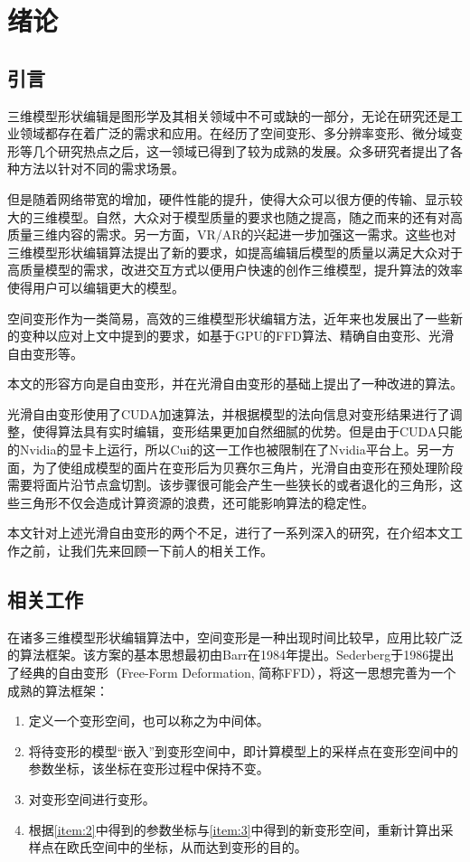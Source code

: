 
\chapter{绪论}
\section{引言}
三维模型形状编辑是图形学及其相关领域中不可或缺的一部分，无论在研究还是工业领域都存在着广泛的需求和应用。在经历了空间变形、多分辨率变形、微分域变形等几个研究热点之后，这一领域已得到了较为成熟的发展。众多研究者提出了各种方法以针对不同的需求场景。

但是随着网络带宽的增加，硬件性能的提升，使得大众可以很方便的传输、显示较大的三维模型。自然，大众对于模型质量的要求也随之提高，随之而来的还有对高质量三维内容的需求。另一方面，VR/AR的兴起进一步加强这一需求。这些也对三维模型形状编辑算法提出了新的要求，如提高编辑后模型的质量以满足大众对于高质量模型的需求，改进交互方式以便用户快速的创作三维模型，提升算法的效率使得用户可以编辑更大的模型。

空间变形作为一类简易，高效的三维模型形状编辑方法，近年来也发展出了一些新的变种以应对上文中提到的要求，如基于GPU的FFD算法\cite{chua2000, modat2010}、精确自由变形\cite{Feng98, Feng00}、光滑自由变形\cite{Cui15}等。

本文的形容方向是自由变形，并在光滑自由变形\cite{Cui15}的基础上提出了一种改进的算法。

光滑自由变形使用了CUDA加速算法，并根据模型的法向信息对变形结果进行了调整，使得算法具有实时编辑，变形结果更加自然细腻的优势。但是由于CUDA只能的Nvidia的显卡上运行，所以Cui的这一工作也被限制在了Nvidia平台上。另一方面，为了使组成模型的面片在变形后为贝赛尔三角片，光滑自由变形在预处理阶段需要将面片沿节点盒切割。该步骤很可能会产生一些狭长的或者退化的三角形，这些三角形不仅会造成计算资源的浪费，还可能影响算法的稳定性。

本文针对上述光滑自由变形的两个不足，进行了一系列深入的研究，在介绍本文工作之前，让我们先来回顾一下前人的相关工作。

\section{相关工作}
在诸多三维模型形状编辑算法中，空间变形是一种出现时间比较早，应用比较广泛的算法框架。该方案的基本思想最初由Barr\cite{Barr84}在1984年提出。Sederberg\cite{Sederberg86}于1986提出了经典的自由变形（Free-Form Deformation, 简称FFD），将这一思想完善为一个成熟的算法框架：
\begin{enumerate}
	\item 定义一个变形空间，也可以称之为中间体。
    \item 将待变形的模型“嵌入”到变形空间中，即计算模型上的采样点在变形空间中的参数坐标，该坐标在变形过程中保持不变。\label{item:2}
	\item 对变形空间进行变形。\label{item:3}
    \item 根据\ref{item:2}中得到的参数坐标与\ref{item:3}中得到的新变形空间，重新计算出采样点在欧氏空间中的坐标，从而达到变形的目的。
\end{enumerate}

